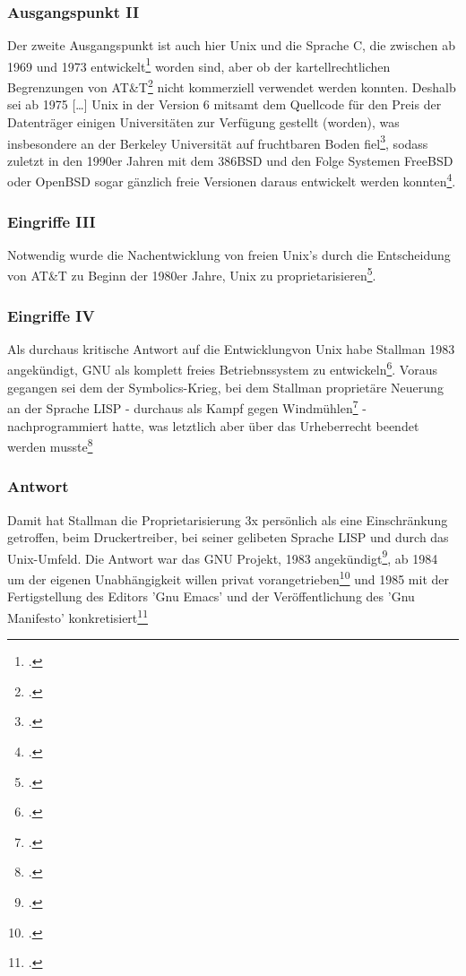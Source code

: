 \documentclass[DIV=calc,BCOR=5mm,11pt,headings=small,oneside,abstract=true, toc=bib]{scrartcl}
\begin{document}
\subsubsection{Ausgangspunkt II}
Der zweite Ausgangspunkt ist auch hier Unix und die Sprache C, die zwischen ab
1969 und 1973 entwickelt\footcite[vgl.][25f]{Viesel2006a} worden sind, aber ob
der kartellrechtlichen Begrenzungen von AT\&T\footcite[vgl.][26]{Viesel2006a}
nicht kommerziell verwendet werden konnten. Deshalb sei ab 1975 \glqq{}[\ldots]
Unix in der Version 6 mitsamt dem Quellcode für den Preis der Datenträger
einigen Universitäten zur Verfügung gestellt (worden)\grqq{}, was insbesondere
an der Berkeley Universität auf fruchtbaren Boden
fiel\footcite[vgl.][26]{Viesel2006a}, sodass zuletzt in den 1990er Jahren mit
dem 386BSD und den Folge Systemen FreeBSD oder OpenBSD sogar gänzlich freie
Versionen daraus entwickelt werden konnten\footcite[vgl.][27]{Viesel2006a}.

\subsubsection{Eingriffe III}

Notwendig wurde die Nachentwicklung von freien Unix's durch die Entscheidung von
AT\&T zu Beginn der 1980er Jahre, Unix zu
proprietarisieren\footcite[vgl.][27]{Viesel2006a}.

\subsubsection{Eingriffe IV}

Als durchaus \glqq{}kritische\grqq{} Antwort auf die
\glqq{}Entwicklungvon Unix\grqq{} habe Stallman 1983 angekündigt, GNU als
\glqq{}komplett freies Betriebnssystem\grqq{} zu
entwickeln\footcite[vgl.][27]{Viesel2006a}. Voraus gegangen sei dem der
\glqq{}Symbolics-Krieg\grqq{}, bei dem Stallman proprietäre Neuerung an der
Sprache LISP - durchaus als \glqq{}Kampf gegen
Windmühlen\grqq{}\footcite[vgl.][31]{Viesel2006a} - nachprogrammiert hatte, was
letztlich aber über das Urheberrecht beendet werden
musste\footcite[vgl.][29f]{Viesel2006a}

\subsubsection{Antwort}

Damit hat Stallman die Proprietarisierung 3x persönlich als eine
Einschränkung getroffen, beim Druckertreiber, bei seiner gelibeten Sprache LISP
und durch das Unix-Umfeld. Die Antwort war das GNU Projekt, 1983
angekündigt\footcite[vgl.][27]{Viesel2006a}, ab 1984 um der eigenen
Unabhängigkeit willen privat vorangetrieben\footcite[vgl.][31]{Viesel2006a} und
1985 mit der Fertigstellung des Editors 'Gnu Emacs' und der Veröffentlichung des
'Gnu Manifesto' konkretisiert\footcite[vgl.][32]{Viesel2006a}
\end{document}
